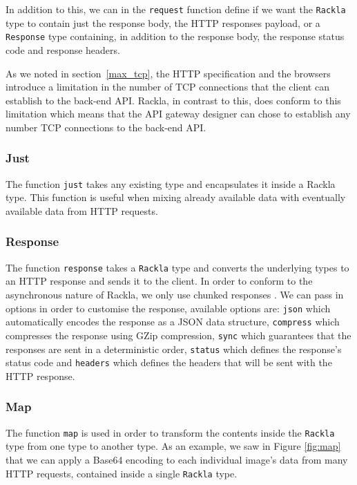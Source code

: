 \documentclass{cslthse-msc}
\begin{document}
In addition to this, we can in the \lstinline{request} function define if we want the \lstinline{Rackla} type to contain just the response body, the HTTP responses payload, or a \lstinline{Response} type containing, in addition to the response body, the response status code and response headers.

As we noted in section~\ref{max_tcp}, the HTTP specification and the browsers introduce a limitation in the number of TCP connections that the client can establish to the back-end API. Rackla, in contrast to this, does conform to this limitation which means that the API gateway designer can chose to establish any number TCP connections to the back-end API.

\subsubsection{Just}
The function \lstinline{just} takes any existing type and encapsulates it inside a Rackla type. This function is useful when mixing already available data with eventually available data from HTTP requests.

\subsubsection{Response}
The function \lstinline{response} takes a \lstinline{Rackla} type and converts the underlying types to an HTTP response and sends it to the client. In order to conform to the asynchronous nature of Rackla, we only use chunked responses \cite{chunked}. We can pass in options in order to customise the response, available options are: \lstinline{json} which automatically encodes the response as a JSON data structure, \lstinline{compress} which compresses the response using GZip compression, \lstinline{sync} which guarantees that the responses are sent in a deterministic order, \lstinline{status} which defines the response's status code and \lstinline{headers} which defines the headers that will be sent with the HTTP response.

\subsubsection{Map}
The function \lstinline{map} is used in order to transform the contents inside the \lstinline{Rackla} type from one type to another type. As an example, we saw in Figure \ref{fig:map} that we can apply a Base64 encoding to each individual image's data from many HTTP requests, contained inside a single \lstinline{Rackla} type.
\end{document}
